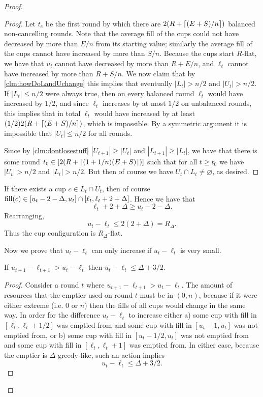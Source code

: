 \begin{proof}
\begin{proof}
  Let $t_e$ be the first round by which there are $2(R +
  \left\lceil (E+S)/n \right\rceil)$ balanced non-cancelling rounds. Note that the
  average fill of the cups could not have decreased by more than
  $E/n$ from its starting value; similarly the average fill of
  the cups cannot have increased by more than $S/n$. Because the
  cups start $R$-flat, we have that $u_t$ cannot have decreased
  by more than $R + E/n$, and $\ell_t$ cannot have increased by
  more than $R + S/n$. We now claim that by
  \cref{clm:howDoLandUchange} this implies that eventually $|L_t|
  > n/2$ and $|U_t| > n/2$. If $|L_t|\le n/2$ were always true,
  then on every balanced round $\ell_t$ would have increased by
  $1/2$, and since $\ell_t$ increases by at most $1/2$ on
  unbalanced rounds, this implies that in total $\ell_t$ would
  have increased by at least $(1/2)2(R + \left\lceil (E+S)/n \right\rceil)$, which is
  impossible. By a symmetric argument it is impossible that
  $|U_t| \le n/2$ for all rounds. 

  Since by \cref{clm:dontlosestuff} $|U_{t+1}|\ge |U_t|$ and $|L_{t+1}|
  \ge |L_t|$, we have that there is some round $t_0 \in [2(R +
  \left\lceil (1+1/n)(E+S) \right\rceil)]$ such that for all $t \ge t_0$ we have
  $|U_t|> n/2$ and $|L_t|> n/2$. But then of course we have
  $U_t\cap L_t \neq \varnothing$, as desired.
  \end{proof}

  If there exists a cup $c \in L_t\cap U_t$, then of course
  $\operatorname{\textnormal{fill}}(c) \in [u_t-2-\Delta, u_t] \cap [\ell_t, \ell_t + 2 +
  \Delta]$. Hence we have that
  $$\ell_t+2+\Delta \ge u_t-2-\Delta.$$ 
  Rearranging, 
  $$u_t - \ell_t \le 2(2+\Delta) = R_\Delta.$$ 
  Thus the cup configuration is $R_\Delta$-flat.


  Now we prove that $u_t - \ell_t$ can only increase if $u_t -
  \ell_t$ is very small.
  \begin{clm}
    \label{clm:uandlgrowclosertogetherunlesstheyreveryclosealready}
    If $u_{t+1}-\ell_{t+1} > u_t - \ell_t$ then $u_t - \ell_t \le \Delta + 3/2$. 
  \end{clm}
  \begin{proof}
  Consider a round $t$ where $u_{t+1} - \ell_{t+1} > u_t -
  \ell_t$. The amount of resources that the emptier used on round
  $t$ must be in $(0, n)$, because if it were either extreme
  (i.e. $0$ or $n$) then the fills of all cups would change in
  the same way. In order for the difference $u_t - \ell_t$ to 
  increase either a) some cup with fill in $[\ell_t, \ell_t + 1/2]$ was
  emptied from and some cup with fill in $[u_t-1, u_t]$ was not
  emptied from, or b) some cup with fill in $[u_t-1/2, u_t]$ was
  not emptied from and some cup with fill in $[\ell_t, \ell_t+1]$ was
  emptied from. In either case, because the emptier is
  $\Delta$-greedy-like, such an action implies
  $$u_t - \ell_t \le \Delta + 3/2.$$
  \end{proof}


\end{proof}
